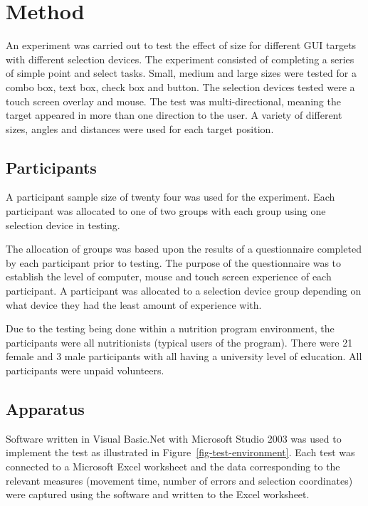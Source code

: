 \documentclass{elsart}
\begin{document}
\section{Method}
\label{sec-method}

An experiment was carried out to test the effect of size for different
GUI targets with different selection devices. The experiment consisted
of completing a series of simple point and select tasks. Small, medium
and large sizes were tested for a combo box, text box, check box and
button. The selection devices tested were a touch screen overlay and
mouse. The test was multi-directional, meaning the target appeared in
more than one direction to the user. A variety of different sizes,
angles and distances were used for each target position.

\subsection{Participants}
\label{sec-method-participants}

A participant sample size of twenty four was used for the experiment.
Each participant was allocated to one of two groups with each group
using one selection device in testing.

The allocation of groups was based upon the results of a questionnaire
completed by each participant prior to testing. The purpose of the
questionnaire was to establish the level of computer, mouse and touch
screen experience of each participant. A participant was allocated to a
selection device group depending on what device they had the least
amount of experience with.

Due to the testing being done within a nutrition program environment,
the participants were all nutritionists (typical users of the program).
There were 21 female and 3 male participants with all having a
university level of education. All participants were unpaid volunteers.

\subsection{Apparatus}
\label{sec-method-apparatus}

Software written in Visual Basic.Net with Microsoft Studio 2003 was used
to implement the test as illustrated in
Figure~\ref{fig-test-environment}. Each test was connected to a Microsoft
Excel worksheet and the data corresponding to the relevant measures
(movement time, number of errors and selection coordinates) were
captured using the software and written to the Excel worksheet.
\end{document}
